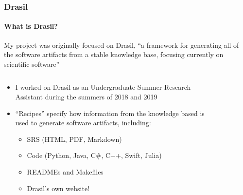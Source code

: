 \documentclass{beamer}
\begin{document}
\begin{frame}
    \frametitle{Drasil}
    \framesubtitle{What is Drasil?}
    My project was originally focused on Drasil, ``a framework for generating
    all of the software artifacts from a stable knowledge base, focusing
    currently on scientific software'' \cite{HuntEtAl2021}
    \vspace{-2mm}
    \begin{columns}[T,onlytextwidth]
        \begin{column}{.6\textwidth}
            \vspace{2mm}
            \begin{minipage}{\textwidth}
                \begin{itemize}
                    \item<2-> I worked on Drasil as an Undergraduate Summer
                          Research Assistant during the summers of 2018 and 2019
                    \item<3-> ``Recipes'' specify how information from the
                          knowledge based is used to generate
                          software artifacts, including:
                          \begin{itemize}
                              \item SRS (HTML, PDF, Markdown)
                              \item Code (Python, Java, C\#, C++, Swift, Julia)
                              \item READMEs and Makefiles
                              \item Drasil's own website\footnotemark[1]!
                          \end{itemize}
                \end{itemize}
            \end{minipage}
        \end{column}
        \begin{column}{.35\textwidth}
            \begin{figure}

\end{figure}
\end{column}
\end{columns}
\end{frame}
\end{document}
